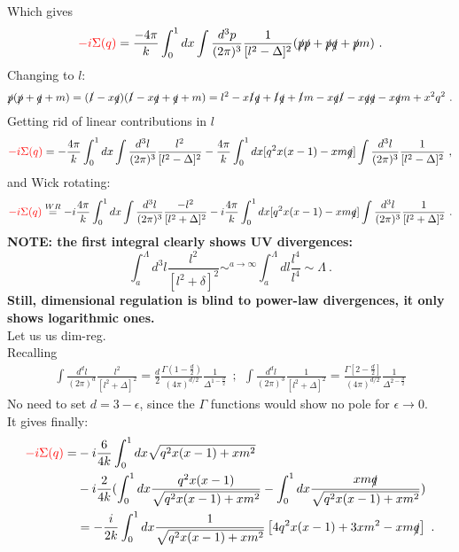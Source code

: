 \documentclass[a4paper,11pt,DIV=12]{scrartcl}
\begin{document}
Which gives 
\begin{align*}
    \textcolor{red}{-i\Sigma(q)}=\frac{-4\pi}{k}\int_0^1 dx \int \frac{d^3p}{(2\pi)^3} \frac{1}{[l^2-\Delta]^2}(\slashed{p}\slashed{p}+\slashed{p}\slashed{q}+\slashed{p}m)\ .
\end{align*}
Changing to $l$:
\begin{align*}
    \slashed{p}(\slashed{p}+\slashed{q}+m) = (\slashed{l}-x\slashed{q})(\slashed{l}-x\slashed{q}+\slashed{q}+m)=l^2 - x\slashed{l}\slashed{q} + \slashed{l}\slashed{q} + \slashed{l}m -x\slashed{q}\slashed{l}-x\slashed{q}\slashed{q} -x \slashed{q}m +x^2q^2\ .
\end{align*}
Getting rid of linear contributions in $l$
\begin{align*}
    \textcolor{red}{-i\Sigma(q)}=-\frac{4\pi}{k}\int_0^1 dx \int \frac{d^3l}{(2\pi)^3} \frac{l^2}{[l^2-\Delta]^2} - \frac{4\pi}{k}\int_0^1 dx [q^2 x(x-1)-x m \slashed{q}]\int \frac{d^3 l}{(2\pi)^3} \frac{1}{[l^2-\Delta]^2}\ ,
\end{align*}
and Wick rotating:
\begin{align*}
    \textcolor{red}{-i\Sigma(q)}\stackrel{WR}{=} -i\frac{4\pi}{k}\int_0^1 dx \int \frac{d^3l}{(2\pi)^3} \frac{-l^2}{[l^2+\Delta]^2} - i\frac{4\pi}{k}\int_0^1 dx [q^2 x(x-1)-x m \slashed{q}]\int \frac{d^3 l}{(2\pi)^3} \frac{1}{[l^2+\Delta]^2}\ .
\end{align*}
\textbf{NOTE: the first integral clearly shows UV divergences:}
\begin{equation*}
    \int_a^\Lambda d^3 l \frac{l^2}{[l^2+\delta]^2} \sim^{a\to \infty} \int_a^\Lambda dl \frac{l^4}{l^4}\sim \Lambda\ .
\end{equation*}
\textbf{Still, dimensional regulation is blind to power-law divergences, it only shows logarithmic ones.}\\
Let us us dim-reg.\\
Recalling 
\begin{align*}
    \int \frac{d^dl}{(2\pi)^d}\frac{l^2}{[l^2+\Delta]^2}=\frac{d}{2}\frac{\Gamma(1-\frac{d}{2})}{(4\pi)^{d/2}}\frac{1}{\Delta^{1-\frac{d}{2}}}\ \ ;\ \ \int \frac{d^d l}{(2\pi)^3}\frac{1}{[l^2+\Delta]^2}=\frac{\Gamma[2-\frac{d}{2}]}{(4\pi)^{d/2}}\frac{1}{\Delta^{2-\frac{d}{2}}}
\end{align*}
No need to set $d=3-\epsilon$, since the $\Gamma$ functions would show no pole for $\epsilon \to 0$.\\
It gives finally:
\begin{align*}
    \textcolor{red}{-i \Sigma(q)} = &-i \frac{6}{4k}\int_0^1 dx \sqrt{q^2 x(x-1)+x m^2}\\
    &-i\frac{2}{4k}(\int_0^1 dx \frac{q^2 x(x-1)}{\sqrt{q^2 x(x-1)+x m^2}} - \int_0^1 dx \frac{x m \slashed{q}}{\sqrt{q^2 x(x-1)+x m^2}})
    \\ &= -\frac{i}{2k}\int_0^1 dx \frac{1}{\sqrt{q^2 x(x-1)+xm^2}}\left[ 4q^2 x (x-1) + 3xm^2 -xm\slashed{q}  \right]\ .
\end{align*}
\end{document}
